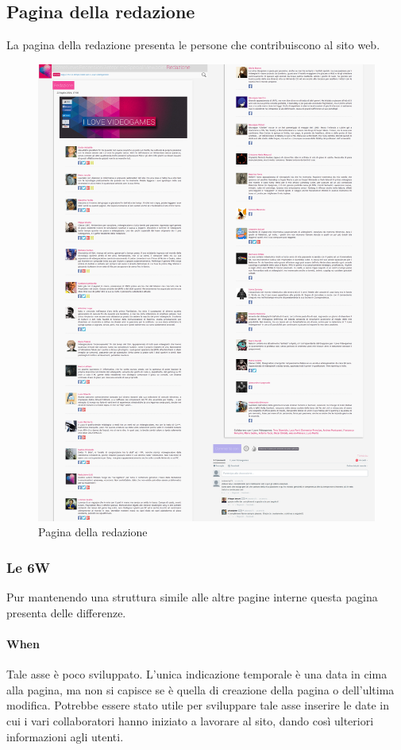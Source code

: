 \documentclass[../ProgettoTecWeb2.tex]{subfiles}
\begin{document}
	\subsection{Pagina della redazione}
	La pagina della redazione presenta le persone che contribuiscono al sito web.
	\begin{figure} [H]
			\centering
			\includegraphics[scale=0.15]{img/Redazione}
			\caption{Pagina della redazione}
	\end{figure}
		\subsubsection{Le 6W}
		Pur mantenendo una struttura simile alle altre pagine interne questa pagina presenta delle differenze.

			\paragraph{When}
			Tale asse è poco sviluppato. L'unica indicazione temporale è una data in cima alla pagina, ma non si capisce se è quella di creazione della pagina o dell'ultima modifica. Potrebbe essere stato utile per sviluppare tale asse inserire le date in cui i vari collaboratori hanno iniziato a lavorare al sito, dando così ulteriori informazioni agli utenti.
\end{document}
